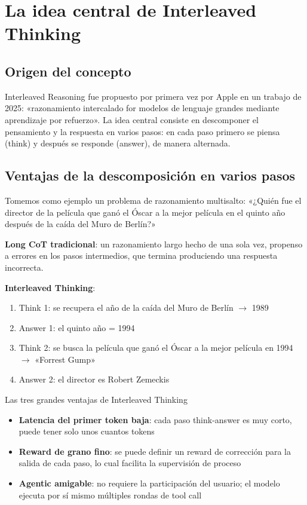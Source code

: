 \documentclass[a4paper]{article}
\begin{document}
\section{La idea central de Interleaved Thinking}

\subsection{Origen del concepto}

Interleaved Reasoning fue propuesto por primera vez por Apple en un trabajo de 2025: «razonamiento intercalado for modelos de lenguaje grandes mediante aprendizaje por refuerzo». La idea central consiste en descomponer el pensamiento y la respuesta en varios pasos: en cada paso primero se piensa (think) y después se responde (answer), de manera alternada.

\subsection{Ventajas de la descomposición en varios pasos}

Tomemos como ejemplo un problema de razonamiento multisalto: «¿Quién fue el director de la película que ganó el Óscar a la mejor película en el quinto año después de la caída del Muro de Berlín?»

\textbf{Long CoT tradicional}: un razonamiento largo hecho de una sola vez, propenso a errores en los pasos intermedios, que termina produciendo una respuesta incorrecta.

\textbf{Interleaved Thinking}:
\begin{enumerate}
  \item Think 1: se recupera el año de la caída del Muro de Berlín $\to$ 1989
  \item Answer 1: el quinto año = 1994
  \item Think 2: se busca la película que ganó el Óscar a la mejor película en 1994 $\to$ «Forrest Gump»
  \item Answer 2: el director es Robert Zemeckis
\end{enumerate}

\begin{importantbox}{Las tres grandes ventajas de Interleaved Thinking}
\begin{itemize}
  \item \textbf{Latencia del primer token baja}: cada paso think-answer es muy corto, puede tener solo unos cuantos tokens
  \item \textbf{Reward de grano fino}: se puede definir un reward de corrección para la salida de cada paso, lo cual facilita la supervisión de proceso
  \item \textbf{Agentic amigable}: no requiere la participación del usuario; el modelo ejecuta por sí mismo múltiples rondas de tool call
\end{itemize}
\end{importantbox}
\end{document}
